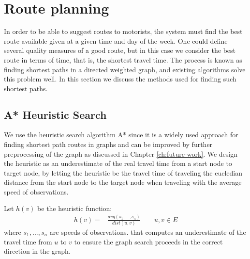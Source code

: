 \section{Route planning}
In order to be able to suggest routes to motorists, the system must find the best route available given at a given time and day of the week. One could define several quality measures of a good route, but in this case we consider the best route in terms of time, that is, the shortest travel time. The process is known as finding shortest paths in a directed weighted graph, and existing algorithms solve this problem well. In this section we discuss the methods used for finding such shortest paths.

\subsection{A* Heuristic Search}\label{sec:pathfinding}
We use the heuristic search algorithm A* since it is a widely used approach for finding shortest path routes in graphs and can be improved by further preprocessing of the graph as discussed in Chapter \ref{ch:future-work}.
We design the heuristic as an underestimate of the real travel time from a start node to target node, by letting the heuristic be the travel time of traveling the eucledian distance from the start node to the target node when traveling with the average speed of observations. 

Let $h(v)$ be the heuristic function:
\begin{align*}
h(v) = &\frac{avg(s_1,…,s_n)}{dist(u,v)} \qquad u,v \in E
\end{align*}
where $s_1,...,s_n$ are speeds of observations.
that computes an underestimate of the travel time from $u$ to $v$ to ensure the graph search proceeds in the correct direction in the graph.

